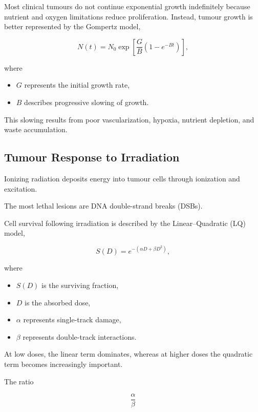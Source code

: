 \documentclass[12pt]{article}
\begin{document}
Most clinical tumours do not continue exponential growth indefinitely because nutrient and oxygen limitations reduce proliferation. Instead, tumour growth is better represented by the Gompertz model,

\begin{equation}
N(t)=N_0
\exp\left[
\frac{G}{B}
\left(
1-e^{-Bt}
\right)
\right],
\end{equation}

where

\begin{itemize}
\item $G$ represents the initial growth rate,
\item $B$ describes progressive slowing of growth.
\end{itemize}

This slowing results from poor vascularization, hypoxia, nutrient depletion, and waste accumulation.


\subsection{Tumour Response to Irradiation}

Ionizing radiation deposits energy into tumour cells through ionization and excitation.

The most lethal lesions are DNA double-strand breaks (DSBs).

Cell survival following irradiation is described by the Linear--Quadratic (LQ) model,

\begin{equation}
S(D)=e^{-(\alpha D+\beta D^2)},
\end{equation}

where

\begin{itemize}
\item $S(D)$ is the surviving fraction,
\item $D$ is the absorbed dose,
\item $\alpha$ represents single-track damage,
\item $\beta$ represents double-track interactions.
\end{itemize}

At low doses, the linear term dominates, whereas at higher doses the quadratic term becomes increasingly important.

The ratio

\[
\frac{\alpha}{\beta}
\]
\end{document}
